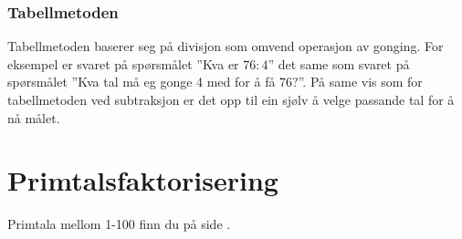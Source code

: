 \subsubsection{Tabellmetoden}
Tabellmetoden baserer seg på divisjon som omvend operasjon av gonging. For eksempel er svaret på spørsmålet ''Kva er $ {76:4} $'' det same som svaret på spørsmålet ''Kva tal må eg gonge 4 med for å få 76?''. På same vis som for tabellmetoden ved subtraksjon er det opp til ein sjølv å velge passande tal for å nå målet.
\begin{center}
	\parbox{0.35\linewidth}{
		} \qquad
\parbox{0.35\linewidth}{
	} \vsk

\parbox{0.415\linewidth}{
}
\end{center}

\section{Primtalsfaktorisering \label{primtalsfakt}}
\mer Primtala mellom 1-100 finn du på side \pageref{primtalfig}.


